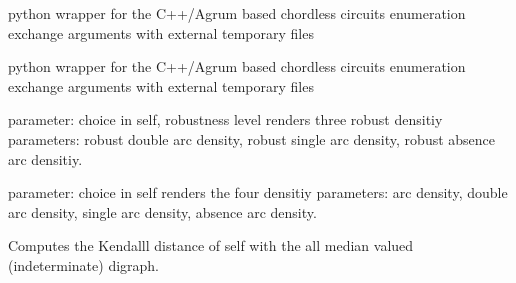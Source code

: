 \documentclass[letterpaper,10pt,english]{sphinxmanual}
\begin{document}
\begin{fulllineitems}
\begin{fulllineitems}
\label{techDoc:digraphs.Digraph.computeCppChordlessCircuits}
python wrapper for the C++/Agrum based chordless circuits enumeration
exchange arguments with external temporary files

\end{fulllineitems}


\begin{fulllineitems}
\label{techDoc:digraphs.Digraph.computeCppInOutPipingChordlessCircuits}
python wrapper for the C++/Agrum based chordless circuits enumeration
exchange arguments with external temporary files

\end{fulllineitems}


\begin{fulllineitems}
\label{techDoc:digraphs.Digraph.computeCutLevelDensities}
parameter: choice in self, robustness level
renders three robust densitiy parameters:
robust double arc density,
robust single arc density,
robust absence arc densitiy.

\end{fulllineitems}


\begin{fulllineitems}
\label{techDoc:digraphs.Digraph.computeDensities}
parameter: choice in self
renders the four densitiy parameters:
arc density, double arc density, single arc density, absence arc density.

\end{fulllineitems}


\begin{fulllineitems}
\label{techDoc:digraphs.Digraph.computeDeterminateness}
Computes the Kendalll distance of self
with the all median valued (indeterminate) digraph.


\end{fulllineitems}
\end{fulllineitems}
\end{document}
